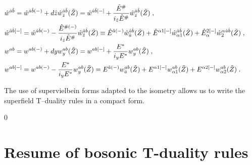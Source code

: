 \documentclass[a4paper,11pt]{article}
\begin{document}
\begin{eqnarray}\label{wabIIA-}
& \hat{w}^{\hat{a}\hat{b}}=  \hat{w}^{\hat{a}\hat{b}(-)}
+ d\hat{z} \hat{w}_{\hat{z}}^{\hat{a}\hat{b}}(\tilde{Z})
= \hat{w}^{\hat{a}\hat{b}[-]} + 
{\hat{E}^{\#}\over i_{\hat{z}} \hat{E}^{\#}} 
 \hat{w}_{\hat{z}}^{\hat{a}\hat{b}}(\tilde{Z})\; , \qquad 
 \nonumber \\ 
& \hat{w}^{\hat{a}\hat{b}[-]}= 
\hat{w}^{\hat{a}\hat{b}(-)}- {\hat{E}^{\# (-)}\over i_{\hat{z}} \hat{E}^{\#}} 
 \hat{w}_{\hat{z}}^{\hat{a}\hat{b}}(\tilde{Z})\equiv 
\hat{E}^{\tilde{a}(-)} 
\hat{w}_{\tilde{a}}^{\hat{a}\hat{b}}(\tilde{Z})
+ \hat{E}^{\alpha 1[-]} 
\hat{w}_{\alpha 1}^{\hat{a}\hat{b}}(\tilde{Z})
+ \hat{E}_{\alpha}^{2[-]} 
\hat{w}^{\alpha}_{2}{}^{\hat{a}\hat{b}}(\tilde{Z}) 
\; , \qquad 
\\ \label{wabIIB-}
& {w}^{{a}{b}} =  
{w}^{{a}{b}(-)} + dy
 {w}_{y}^{{a}{b}}(\tilde{Z})
= {w}^{{a}{b}[-]} + {{E}^{*}\over i_y{E}^{*}} 
 {w}_{y}^{{a}{b}}(\tilde{Z})
\; , \qquad 
\nonumber \\ 
& {w}^{{a}{b}[-]}= {w}^{{a}{b}(-)} - {{E}^{*}\over i_y{E}^{*}} 
 {w}_{y}^{{a}{b}}(\tilde{Z})= 
{E}^{\tilde{a}(-)} 
{w}_{\tilde{a}}^{{a}{b}}(\tilde{Z})
+  
{E}^{\alpha 1[-]} 
{w}_{\alpha 1}^{{a}{b}}(\tilde{Z})
+ {E}^{\alpha 2[-]} 
{w}_{\alpha 2}^{{a}{b}}(\tilde{Z})\; . \qquad 
\end{eqnarray}


The use of supervielbein forms adapted to the isometry allows us to 
write the superfield T--duality rules in a compact form. 


\setcounter{equation}0
\section{Resume of bosonic T-duality rules}
\end{document}
